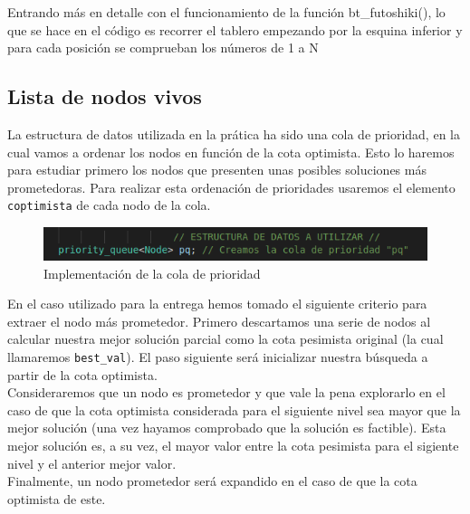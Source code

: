 \documentclass[12pt]{article}
\begin{document}
Entrando más en detalle con el funcionamiento de la función bt\_futoshiki(),
lo que se hace en el código es recorrer el tablero empezando por la esquina 
inferior y para cada posición se comprueban los números de 1 a N 


\subsection{Lista de nodos vivos}
La estructura de datos utilizada en la prática ha sido una cola de prioridad,
en la cual vamos a ordenar los nodos en función de la cota optimista. Esto lo
haremos para estudiar primero los nodos que presenten unas posibles soluciones
más prometedoras. Para realizar esta ordenación de prioridades usaremos el elemento \verb|coptimista| de cada nodo
de la cola.\\

\begin{figure}[h]
    \centering
    \includegraphics[scale=0.5]{cola_de_prior.png}
    \caption{Implementación de la cola de prioridad}
    \label{fig:colprior}
\end{figure}

En el caso utilizado para la entrega hemos tomado el siguiente criterio para extraer
el nodo más prometedor. Primero descartamos una serie de nodos al calcular
nuestra mejor solución parcial como la cota pesimista original (la cual llamaremos
\verb|best_val|). El paso siguiente será inicializar nuestra búsqueda a partir de la cota optimista.\\

Consideraremos que un nodo es prometedor y que vale la pena explorarlo en el caso de que la cota optimista
considerada para el siguiente nivel sea mayor que la mejor solución (una vez hayamos comprobado que
la solución es factible). Esta mejor solución es, a su vez, el mayor valor entre la
cota pesimista para el sigiente nivel y el anterior mejor valor.\\

Finalmente, un nodo prometedor será expandido en el caso de que la cota optimista
de este.
\end{document}
